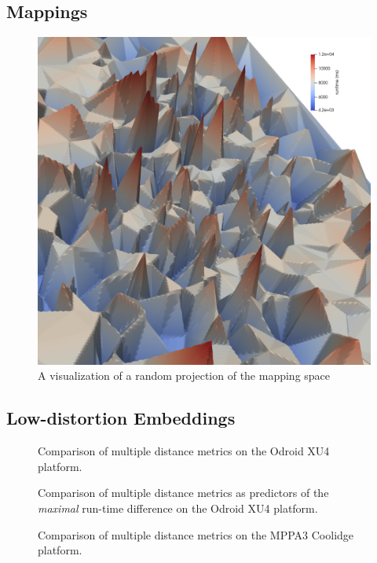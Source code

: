 \subsection{Mappings}
\begin{figure}[h]
	\centering
\includegraphics[width=\textwidth]{figures/coolidge-af-space2.png}
	\caption{A visualization of a random projection of the mapping space}
	\label{fig:mapping_space}
\end{figure}

\subsection{Low-distortion Embeddings}

\begin{figure}[h]
	\centering
	\caption{Comparison of multiple distance metrics on the Odroid XU4 platform.}
	\label{fig:metric_comparison}
\end{figure}

\begin{figure}[h]
	\centering
	\caption{Comparison of multiple distance metrics as predictors of the \emph{maximal} run-time difference on the Odroid XU4 platform.}
	\label{fig:metric_comparison_max}
\end{figure}
\begin{figure}[h]
	\centering
	\caption{Comparison of multiple distance metrics on the MPPA3 Coolidge platform.}
	\label{fig:metric_comparison}
\end{figure}

